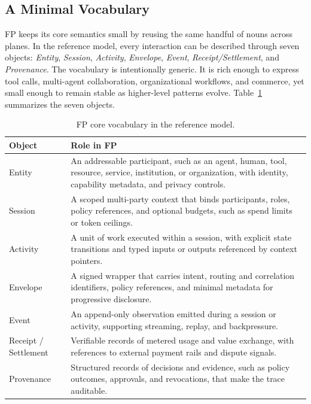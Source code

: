 \documentclass{foundationpaper}
\begin{document}
\subsection{A Minimal Vocabulary}
\label{subsec:vocab}

FP keeps its core semantics small by reusing the same handful of nouns across planes. In the reference model, every interaction can be described through seven objects: \emph{Entity}, \emph{Session}, \emph{Activity}, \emph{Envelope}, \emph{Event}, \emph{Receipt/Settlement}, and \emph{Provenance}. The vocabulary is intentionally generic. It is rich enough to express tool calls, multi-agent collaboration, organizational workflows, and commerce, yet small enough to remain stable as higher-level patterns evolve. Table~\ref{tab:vocab} summarizes the seven objects. 

\begin{table}[ht]
\centering
\caption{FP core vocabulary in the reference model.}
\label{tab:vocab}
\footnotesize
\begin{tabular}{@{}p{} p{}@{}}
\toprule
\textbf{Object} & \textbf{Role in FP} \\
\midrule
Entity & An addressable participant, such as an agent, human, tool, resource, service, institution, or organization, with identity, capability metadata, and privacy controls. \\
Session & A scoped multi-party context that binds participants, roles, policy references, and optional budgets, such as spend limits or token ceilings. \\
Activity & A unit of work executed within a session, with explicit state transitions and typed inputs or outputs referenced by context pointers. \\
Envelope & A signed wrapper that carries intent, routing and correlation identifiers, policy references, and minimal metadata for progressive disclosure. \\
Event & An append-only observation emitted during a session or activity, supporting streaming, replay, and backpressure. \\
Receipt / Settlement & Verifiable records of metered usage and value exchange, with references to external payment rails and dispute signals. \\
Provenance & Structured records of decisions and evidence, such as policy outcomes, approvals, and revocations, that make the trace auditable. \\
\bottomrule
\end{tabular}
\end{table}
\end{document}
